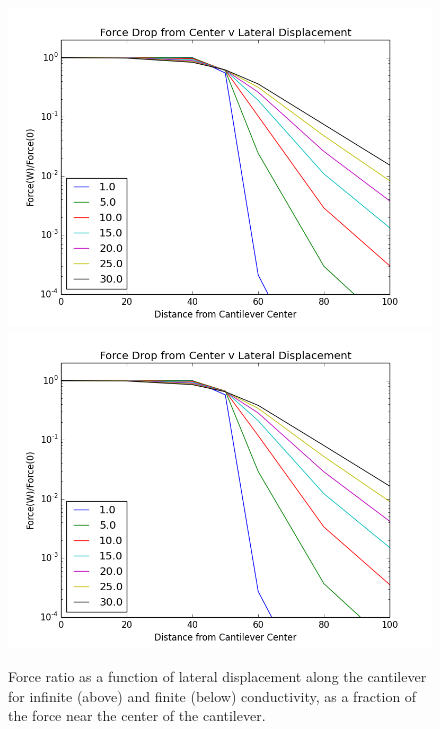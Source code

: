\documentclass[11pt,traditabstract]{article}
\begin{document}
\begin{figure}[h]
\centering
\includegraphics[width=5in]{lateral_force_drop}
\includegraphics[width=5in]{lateral_force_drop_finite}
\caption{Force ratio as a function of lateral displacement along the cantilever for infinite (above) and finite (below) conductivity, as a fraction of the force near the center of the cantilever.}\label{fig:latdrop}
\end{figure}
\end{document}
